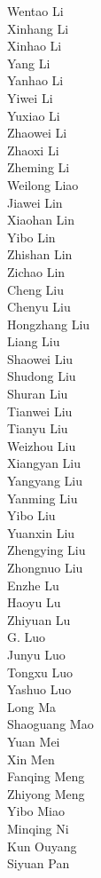 Wentao Li\\
Xinhang Li\\
Xinhao Li\\
Yang Li\\
Yanhao Li\\
Yiwei Li\\
Yuxiao Li\\
Zhaowei Li\\
Zhaoxi Li\\
Zheming Li\\
Weilong Liao\\
Jiawei Lin\\
Xiaohan Lin\\
Yibo Lin\\
Zhishan Lin\\
Zichao Lin\\
Cheng Liu\\
Chenyu Liu\\
Hongzhang Liu\\
Liang Liu\\
Shaowei Liu\\
Shudong Liu\\
Shuran Liu\\
Tianwei Liu\\
Tianyu Liu\\
Weizhou Liu\\
Xiangyan Liu\\
Yangyang Liu\\
Yanming Liu\\
Yibo Liu\\
Yuanxin Liu\\
Zhengying Liu\\
Zhongnuo Liu\\
Enzhe Lu\\
Haoyu Lu\\
Zhiyuan Lu\\
G. Luo\\
Junyu Luo\\
Tongxu Luo\\
Yashuo Luo\\
Long Ma\\
Shaoguang Mao\\
Yuan Mei\\
Xin Men\\
Fanqing Meng\\
Zhiyong Meng\\
Yibo Miao\\
Minqing Ni\\
Kun Ouyang\\
Siyuan Pan\\
